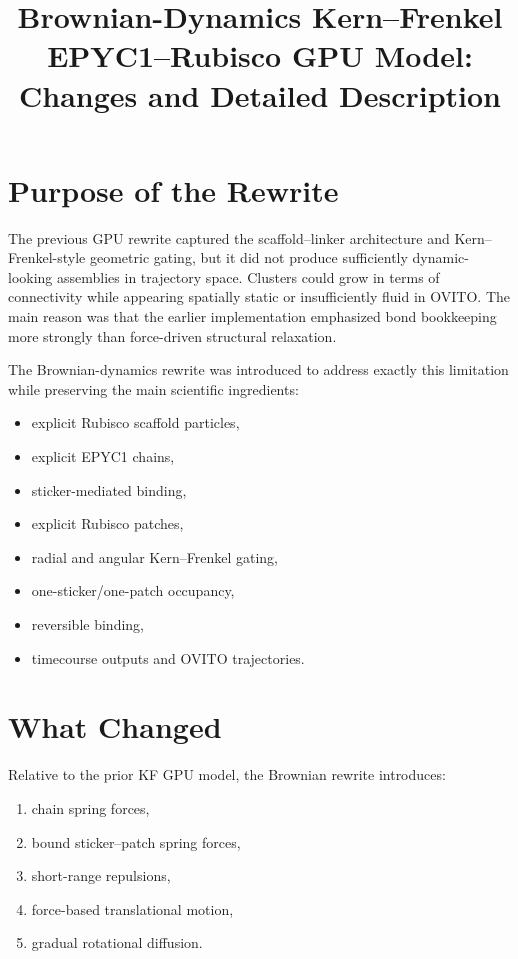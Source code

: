 \documentclass[11pt]{article}
\title{Brownian-Dynamics Kern--Frenkel EPYC1--Rubisco GPU Model: Changes and Detailed Description}
\author{}
\date{}
\begin{document}
\maketitle
\tableofcontents

\section{Purpose of the Rewrite}
The previous GPU rewrite captured the scaffold--linker architecture and Kern--Frenkel-style geometric gating, but it did not produce sufficiently dynamic-looking assemblies in trajectory space. Clusters could grow in terms of connectivity while appearing spatially static or insufficiently fluid in OVITO. The main reason was that the earlier implementation emphasized bond bookkeeping more strongly than force-driven structural relaxation.

The Brownian-dynamics rewrite was introduced to address exactly this limitation while preserving the main scientific ingredients:
\begin{itemize}
    \item explicit Rubisco scaffold particles,
    \item explicit EPYC1 chains,
    \item sticker-mediated binding,
    \item explicit Rubisco patches,
    \item radial and angular Kern--Frenkel gating,
    \item one-sticker/one-patch occupancy,
    \item reversible binding,
    \item timecourse outputs and OVITO trajectories.
\end{itemize}

\section{What Changed}
Relative to the prior KF GPU model, the Brownian rewrite introduces:
\begin{enumerate}[label=\arabic*.]
    \item chain spring forces,
    \item bound sticker--patch spring forces,
    \item short-range repulsions,
    \item force-based translational motion,
    \item gradual rotational diffusion.
\end{enumerate}
\end{document}
